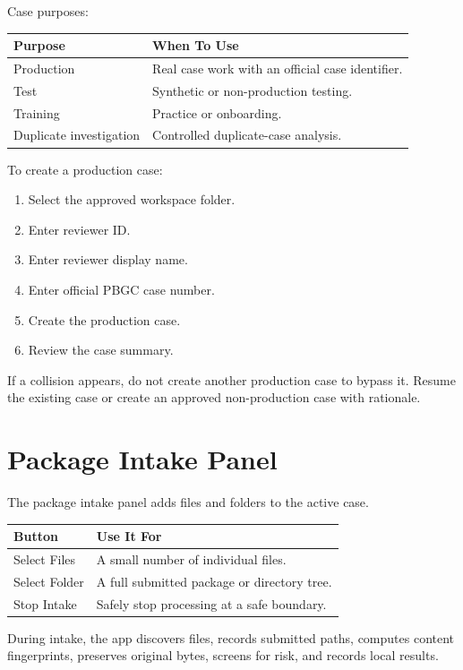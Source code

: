 Case purposes:

\begin{longtable}{L{0.30\textwidth}L{0.60\textwidth}}
\toprule
\textbf{Purpose} & \textbf{When To Use} \\
\midrule
Production & Real case work with an official case identifier. \\
Test & Synthetic or non-production testing. \\
Training & Practice or onboarding. \\
Duplicate investigation & Controlled duplicate-case analysis. \\
\bottomrule
\end{longtable}

To create a production case:

\begin{enumerate}
  \item Select the approved workspace folder.
  \item Enter reviewer ID.
  \item Enter reviewer display name.
  \item Enter official PBGC case number.
  \item Create the production case.
  \item Review the case summary.
\end{enumerate}

If a collision appears, do not create another production case to bypass it. Resume the existing case or create an approved non-production case with rationale.

\section{Package Intake Panel}

The package intake panel adds files and folders to the active case.

\begin{longtable}{L{0.30\textwidth}L{0.60\textwidth}}
\toprule
\textbf{Button} & \textbf{Use It For} \\
\midrule
Select Files & A small number of individual files. \\
Select Folder & A full submitted package or directory tree. \\
Stop Intake & Safely stop processing at a safe boundary. \\
\bottomrule
\end{longtable}

During intake, the app discovers files, records submitted paths, computes content fingerprints, preserves original bytes, screens for risk, and records local results.

